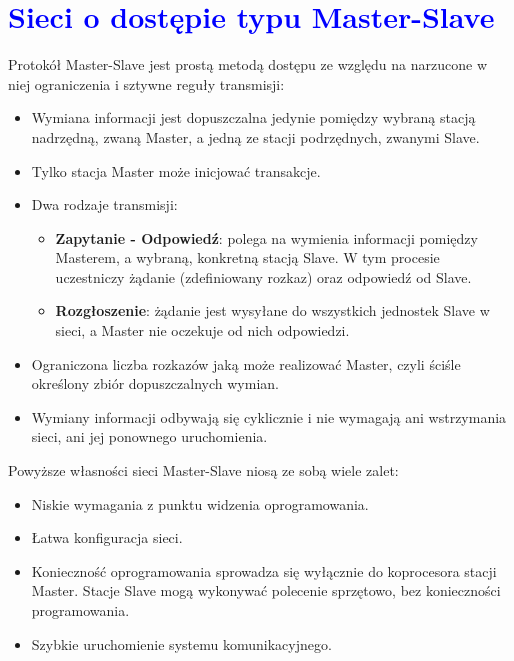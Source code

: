 \documentclass[a4paper,twoside]{article}
\begin{document}
\section{\textcolor{blue}{Sieci o dostępie typu Master-Slave}}
Protokół Master-Slave jest prostą metodą dostępu ze względu na narzucone w niej ograniczenia i sztywne reguły transmisji:
\begin{itemize}
	\item Wymiana informacji jest dopuszczalna jedynie pomiędzy wybraną stacją nadrzędną, zwaną Master, a jedną ze stacji podrzędnych, zwanymi Slave.
	\item Tylko stacja Master może inicjować transakcje.
	\item Dwa rodzaje transmisji:
	\begin{itemize}
		\item \textbf{Zapytanie - Odpowiedź}: polega na wymienia informacji pomiędzy Masterem, a wybraną, konkretną stacją Slave. W tym procesie uczestniczy żądanie (zdefiniowany rozkaz) oraz odpowiedź od Slave.
		\item \textbf{Rozgłoszenie}: żądanie jest wysyłane do wszystkich jednostek Slave w sieci, a Master nie oczekuje od nich odpowiedzi.
	\end{itemize}
	\item Ograniczona liczba rozkazów jaką może realizować Master, czyli ściśle określony zbiór dopuszczalnych wymian.
	\item Wymiany informacji odbywają się cyklicznie i nie wymagają ani wstrzymania sieci, ani jej ponownego uruchomienia.
\end{itemize}
Powyższe własności sieci Master-Slave niosą ze sobą wiele zalet:
\begin{itemize}
	\item Niskie wymagania z punktu widzenia oprogramowania.
	\item Łatwa konfiguracja sieci.
	\item Konieczność oprogramowania sprowadza się wyłącznie do koprocesora stacji Master. Stacje Slave mogą wykonywać polecenie sprzętowo, bez konieczności programowania.
	\item Szybkie uruchomienie systemu komunikacyjnego.
\end{itemize}
\end{document}

